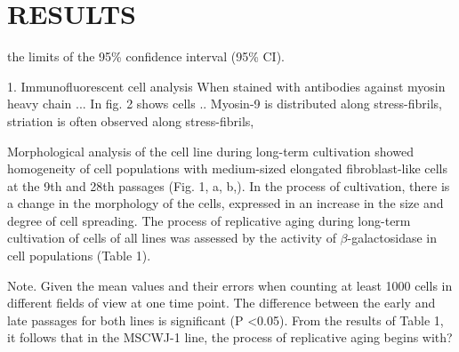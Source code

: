 \documentclass[english,authoryear]{elsarticle}
\begin{document}
\section{RESULTS}

the limits of the 95\% confidence interval (95\% CI).

1. Immunofluorescent cell analysis
When stained with antibodies against myosin heavy chain ...
In fig. 2 shows cells ..
Myosin-9 is distributed along stress-fibrils, striation is often observed along stress-fibrils,

Morphological analysis of the cell line during long-term cultivation showed homogeneity of cell populations with medium-sized elongated fibroblast-like cells at the 9th and 28th passages (Fig. 1, a, b,). In the process of cultivation, there is a change in the morphology of the cells, expressed in an increase in the size and degree of cell spreading.
The process of replicative aging during long-term cultivation of cells of all lines was assessed by the activity of $\beta$-galactosidase in cell populations (Table 1).


Note. Given the mean values and their errors when counting at least 1000 cells in different fields of view at one time point. The difference between the early and late passages for both lines is significant (P <0.05).
  From the results of Table 1, it follows that in the MSCWJ-1 line, the process of replicative aging begins with?
\end{document}
